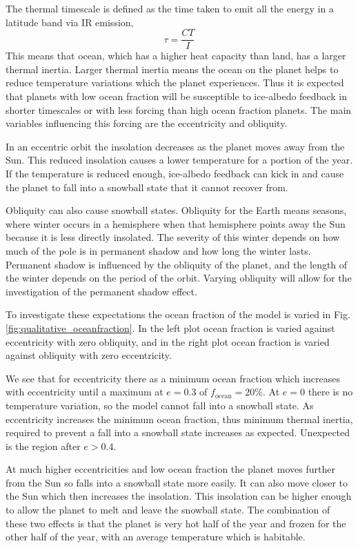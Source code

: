 \documentclass[12pt, onecolumn]{revtex4-2}    %
\begin{document}
The thermal timescale is defined as the time taken to emit all the energy in a latitude band via IR emission,
\begin{equation}
  \tau = \frac{C T}{I}
  \label{eq:thermal_time_scale}
\end{equation}
This means that ocean, which has a higher heat capacity than land, has a larger thermal inertia.
Larger thermal inertia means the ocean on the planet helps to reduce temperature variations which the planet experiences.
Thus it is expected that planets with low ocean fraction will be susceptible to ice-albedo feedback in shorter timescales or with less forcing than high ocean fraction planets.
The main variables influencing this forcing are the eccentricity and obliquity.

In an eccentric orbit the insolation decreases as the planet moves away from the Sun.
This reduced insolation causes a lower temperature for a portion of the year.
If the temperature is reduced enough, ice-albedo feedback can kick in and cause the planet to fall into a snowball state that it cannot recover from.

Obliquity can also cause snowball states.
Obliquity for the Earth means seasons, where winter occurs in a hemisphere when that hemisphere points away the Sun because it is less directly insolated.
The severity of this winter depends on how much of the pole is in permanent shadow and how long the winter lasts.
Permanent shadow is influenced by the obliquity of the planet, and the length of the winter depends on the period of the orbit.
Varying obliquity will allow for the investigation of the permanent shadow effect.

To investigate these expectations the ocean fraction of the model is varied in Fig. \ref{fig:qualitative_oceanfraction}.
In the left plot ocean fraction is varied against eccentricity with zero obliquity, and in the right plot ocean fraction is varied against obliquity with zero eccentricity.

We see that for eccentricity there as a minimum ocean fraction which increases with eccentricity until a maximum at $e=0.3$ of $f_\text{ocean} = 20\%$.
At $e=0$ there is no temperature variation, so the model cannot fall into a snowball state.
As eccentricity increases the minimum ocean fraction, thus minimum thermal inertia, required to prevent a fall into a snowball state increases as expected.
Unexpected is the region after $e > 0.4$.

At much higher eccentricities and low ocean fraction the planet moves further from the Sun so falls into a snowball state more easily.
It can also move closer to the Sun which then increases the insolation.
This insolation can be higher enough to allow the planet to melt and leave the snowball state.
The combination of these two effects is that the planet is very hot half of the year and frozen for the other half of the year, with an average temperature which is habitable.
\end{document}

